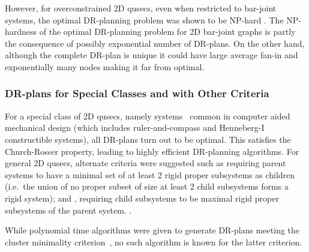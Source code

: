 However, for overconstrained 2D qusecs, even when restricted to bar-joint systems, the optimal DR-planning problem was shown to be NP-hard \cite{lomonosov2004graph, sitharam2005combinatorial}.
The NP-hardness of the optimal DR-planning problem for 2D bar-joint graphs is partly the consequence of possibly exponential number of DR-plans. On the other hand, although the complete DR-plan is unique it could have large average fan-in and exponentially many nodes making it far from optimal.

\subsubsection{DR-plans for Special Classes and with Other Criteria}
For a special class of 2D qusecs, namely  systems~\cite{owen1991algebraic,fudos1997graph,joan-arinyo2004revisiting} common in computer aided mechanical design (which includes ruler-and-compass and Henneberg-I constructible systems), all DR-plans turn out to be optimal. This satisfies the Church-Rosser property, leading to highly efficient DR-planning algorithms. For general 2D qusecs, alternate criteria were suggested such as  requiring parent systems to have a minimal set of at least 2 rigid proper subsystems as children (i.e.\ the union of no proper subset of size at least 2 child subsystems forms a rigid system); and , requiring child subsystems to be maximal rigid proper subsystems of the parent system. \seedefsc.

While polynomial time algorithms were given to generate DR-plans meeting the cluster minimality criterion~\cite{lomonosov2004graph}, no such algorithm is known for the latter criterion.






